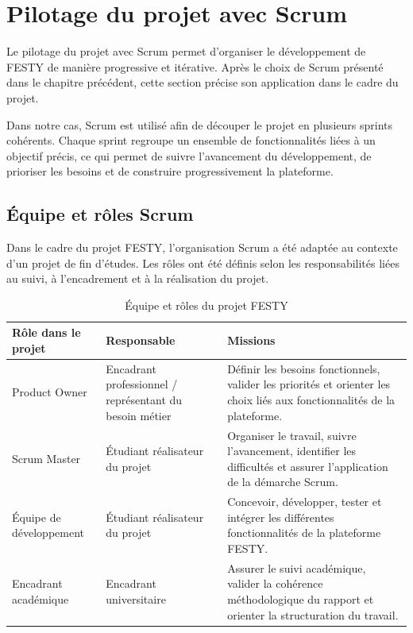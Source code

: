 \section{Pilotage du projet avec Scrum}


Le pilotage du projet avec Scrum permet d’organiser le développement de FESTY de manière progressive et itérative. Après le choix de Scrum présenté dans le chapitre précédent, cette section précise son application dans le cadre du projet.


Dans notre cas, Scrum est utilisé afin de découper le projet en plusieurs sprints cohérents. Chaque sprint regroupe un ensemble de fonctionnalités liées à un objectif précis, ce qui permet de suivre l’avancement du développement, de prioriser les besoins et de construire progressivement la plateforme.


\subsection{Équipe et rôles Scrum}


Dans le cadre du projet FESTY, l’organisation Scrum a été adaptée au contexte d’un projet de fin d’études. Les rôles ont été définis selon les responsabilités liées au suivi, à l’encadrement et à la réalisation du projet.


\begin{table}[H]
\centering
\caption{Équipe et rôles du projet FESTY}
\label{tableau:2-4}
\renewcommand{\arraystretch}{1.2}
\begin{tabularx}{\textwidth}{|>{\raggedright\arraybackslash}X|>{\raggedright\arraybackslash}X|>{\raggedright\arraybackslash}X|}
\hline
\rowcolor[HTML]{ECF4FF}
\textbf{Rôle dans le projet} & \textbf{Responsable} & \textbf{Missions} \\
\hline
Product Owner & Encadrant professionnel / représentant du besoin métier & Définir les besoins fonctionnels, valider les priorités et orienter les choix liés aux fonctionnalités de la plateforme. \\
\hline
Scrum Master & Étudiant réalisateur du projet & Organiser le travail, suivre l’avancement, identifier les difficultés et assurer l’application de la démarche Scrum. \\
\hline
Équipe de développement & Étudiant réalisateur du projet & Concevoir, développer, tester et intégrer les différentes fonctionnalités de la plateforme FESTY. \\
\hline
Encadrant académique & Encadrant universitaire & Assurer le suivi académique, valider la cohérence méthodologique du rapport et orienter la structuration du travail. \\
\hline
\end{tabularx}
\end{table}


